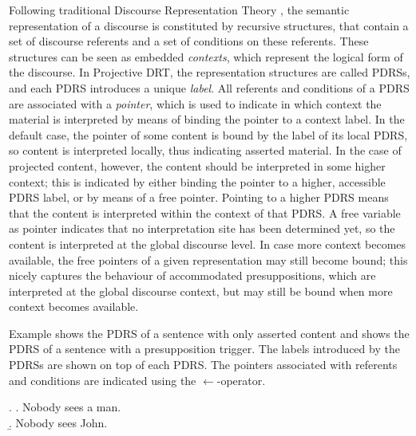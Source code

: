 Following traditional Discourse Representation Theory
\citep[DRT,][]{kamp1993discourse}, the semantic representation of
a discourse is constituted by recursive structures, that contain a set of
discourse referents and a set of conditions on these referents. These
structures can be seen as embedded \emph{contexts}, which represent the
logical form of the discourse.  In Projective DRT, the representation
structures are called PDRSs, and each PDRS introduces a unique \emph{label}.
All referents and conditions of a PDRS are associated with a \emph{pointer},
which is used to indicate in which context the material is interpreted by
means of binding the pointer to a context label.  In the default case, the
pointer of some content is bound by the label of its local PDRS, so content
is interpreted locally, thus indicating asserted material. In the case of
projected content, however, the content should be interpreted in some higher
context; this is indicated by either binding the pointer to a higher,
accessible PDRS label, or by means of a free pointer.  Pointing to a higher
PDRS means that the content is interpreted within the context of that PDRS.
A free variable as pointer indicates that no interpretation site has been
determined yet, so the content is interpreted at the global discourse level.
In case more context becomes available, the free pointers of a given
representation may still become bound; this nicely captures the behaviour of
accommodated presuppositions, which are interpreted at the global discourse
context, but may still be bound when more context becomes available.

Example \Next[a] shows the PDRS of a sentence
with only asserted content and \Next[b] shows the PDRS of a sentence with
a presupposition trigger. The labels introduced by the PDRSs are shown on
top of each PDRS.  The pointers associated with referents and conditions are
indicated using the $\gets$-operator. 

\begin{flushleft}
\begin{minipage}{0.85\linewidth}
\begin{multicols}{2}
\ex. \a. Nobody sees a man.\\
\b. Nobody sees John.\\

\end{multicols}
\end{minipage}\\
\end{flushleft}

